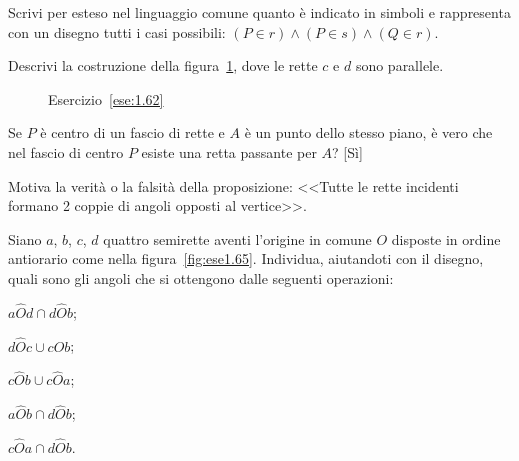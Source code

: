 \begin{esercizio}
\label{ese:1.61}
Scrivi per esteso nel linguaggio comune quanto è indicato in simboli 
e rappresenta con un disegno tutti i casi possibili: $(P\in r)\wedge 
(P\in s)\wedge (Q\in r)$.
\end{esercizio}

\begin{esercizio}
\label{ese:1.62}
Descrivi la costruzione della figura~\ref{fig:ese1.62}, dove le rette 
$c$ e $d$ sono parallele.
\end{esercizio}


\begin{inaccessibleblock}
 \begin{figure}[htb]
 \centering
 \caption{Esercizio~\ref{ese:1.62}}\label{fig:ese1.62}
\end{figure}
\end{inaccessibleblock}
 
\begin{esercizio}
\label{ese:1.63}
Se $P$ è centro di un fascio di rette e $A$ è un punto dello stesso 
piano, è vero che nel fascio di centro $P$ esiste una retta passante 
per $A$?
\hfill[Sì]
\end{esercizio}

\begin{esercizio}
\label{ese:1.64}
Motiva la verità o la falsità della proposizione: <<Tutte le rette 
incidenti formano 2 coppie di angoli opposti al vertice>>.
\end{esercizio}

\begin{esercizio}
\label{ese:1.65}
Siano $a$, $b$, $c$, $d$ quattro semirette aventi l'origine in comune 
$O$ disposte in ordine antiorario come nella 
figura~\ref{fig:ese1.65}. Individua, aiutandoti con il disegno, quali 
sono gli angoli che si ottengono dalle seguenti operazioni:
\begin{multicols}{3}
\begin{enumeratea}
\item $a\widehat{O}d \cap d\widehat{O}b$;
\item $d\widehat{O}c \cup c\widehat{O}b$;
\item $c\widehat{O}b \cup c\widehat{O}a$;
\item $a\widehat{O}b \cap d\widehat{O}b$;
\item $c\widehat{O}a \cap d\widehat{O}b$.
\end{enumeratea}
\end{multicols}
\end{esercizio}



